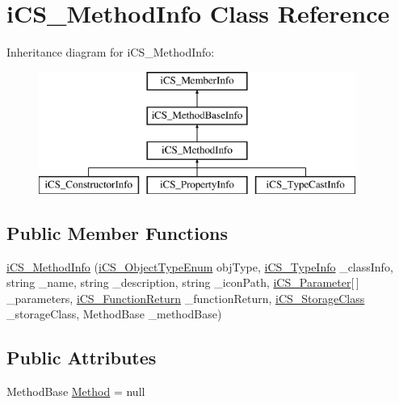 \hypertarget{classi_c_s___method_info}{\section{i\+C\+S\+\_\+\+Method\+Info Class Reference}
\label{classi_c_s___method_info}
}
Inheritance diagram for i\+C\+S\+\_\+\+Method\+Info\+:\begin{figure}[H]
\begin{center}
\leavevmode
\includegraphics[height=4.000000cm]{classi_c_s___method_info}
\end{center}
\end{figure}
\subsection*{Public Member Functions}
\begin{DoxyCompactItemize}
\item 
\hyperlink{classi_c_s___method_info_ac5950d6a6736d8d4e3f5203ef8ed4c7f}{i\+C\+S\+\_\+\+Method\+Info} (\hyperlink{i_c_s___object_type_enum_8cs_ae6c3dd6d8597380b56d94908eb431547}{i\+C\+S\+\_\+\+Object\+Type\+Enum} obj\+Type, \hyperlink{classi_c_s___type_info}{i\+C\+S\+\_\+\+Type\+Info} \+\_\+class\+Info, string \+\_\+name, string \+\_\+description, string \+\_\+icon\+Path, \hyperlink{classi_c_s___parameter}{i\+C\+S\+\_\+\+Parameter}\mbox{[}$\,$\mbox{]} \+\_\+parameters, \hyperlink{classi_c_s___function_return}{i\+C\+S\+\_\+\+Function\+Return} \+\_\+function\+Return, \hyperlink{i_c_s___storage_class_8cs_a4e1bb1da155050e4b0d0118f813194aa}{i\+C\+S\+\_\+\+Storage\+Class} \+\_\+storage\+Class, Method\+Base \+\_\+method\+Base)
\end{DoxyCompactItemize}
\subsection*{Public Attributes}
\begin{DoxyCompactItemize}
\item 
Method\+Base \hyperlink{classi_c_s___method_info_a1af4db5a9d68d17b9ea0b8a61d4555b5}{Method} = null
\end{DoxyCompactItemize}

